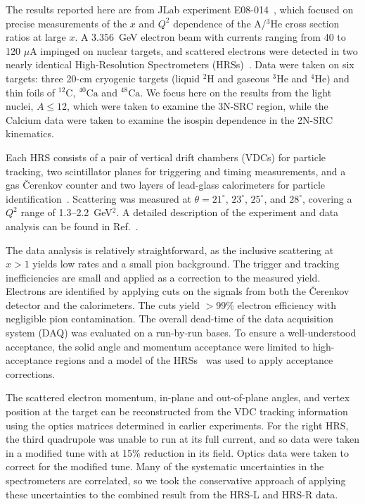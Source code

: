 \documentclass[aps,prl,superscriptaddress,showpacs,twocolumn,floatfix,amsmath,amssymb]{revtex4-1}
\begin{document}


%
The results reported here are from JLab experiment E08-014~\cite{e08014_pr}, which focused on precise
measurements of the $x$ and $Q^2$ dependence of the A/$^3$He cross section ratios at large $x$. A $3.356$~GeV
electron beam with currents ranging from 40 to 120 $\mu$A impinged on nuclear targets, and scattered
electrons were detected in two nearly identical High-Resolution Spectrometers (HRSs)~\cite{halla_nim}. Data
were taken on six targets: three 20-cm cryogenic targets (liquid $^2$H and gaseous $^3$He and $^4$He) and
thin foils of $\mathrm{^{12}C}$, $\mathrm{^{40}Ca}$ and $\mathrm{^{48}Ca}$. We focus here on the results from
the light nuclei, $A \leq 12$, which were taken to examine the 3N-SRC region, while the Calcium data were
taken to examine the isospin dependence in the 2N-SRC kinematics.

Each HRS consists of a pair of vertical drift chambers (VDCs) for particle tracking, two scintillator planes
for triggering and timing measurements, and a gas \v{C}erenkov counter and two layers of lead-glass
calorimeters for particle identification~\cite{halla_nim}. Scattering was measured at $\theta=21^\circ$,
$23^\circ$, $25^\circ$, and $28^\circ$, covering a $Q^2$ range of 1.3--2.2~GeV$^2$. A detailed description
of the experiment and data analysis can be found in Ref.~\cite{zye_thesis}.



The data analysis is relatively straightforward, as the inclusive scattering at $x>1$ yields low rates and a
small pion background. The trigger and tracking inefficiencies are small and applied as a correction to the
measured yield. Electrons are identified by applying cuts on the signals from both the \v{C}erenkov detector
and the calorimeters. The cuts yield $>99$\% electron efficiency with negligible pion contamination. The
overall dead-time of the data acquisition system (DAQ) was evaluated on a run-by-run bases. To ensure a
well-understood acceptance, the solid angle and momentum acceptance were limited to high-acceptance regions
and a model of the HRSs~\cite{zye_thesis} was used to apply acceptance corrections.

The scattered electron momentum, in-plane and out-of-plane angles, and vertex position at the target can be
reconstructed from the VDC tracking information using the optics matrices determined in earlier experiments.
For the right HRS, the third quadrupole was unable to run at its full current, and so data were taken in a
modified tune with at 15\% reduction in its field. Optics data were taken to correct for the modified
tune. Many of the systematic uncertainties in the spectrometers are correlated, so we took the
conservative approach of applying these uncertainties to the combined result from the HRS-L and HRS-R data.
\end{document}
